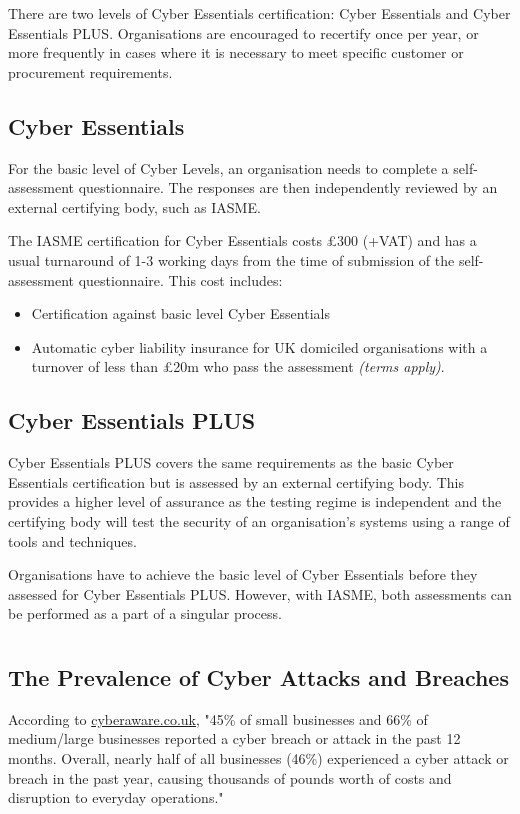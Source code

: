 \documentclass[12pt]{article}
\begin{document}
There are two levels of Cyber Essentials certification: Cyber Essentials and Cyber Essentials PLUS. Organisations are encouraged to recertify once per year, or more frequently in cases where it is necessary to meet specific customer or procurement requirements.

\subsection*{Cyber Essentials}
For the basic level of Cyber Levels, an organisation needs to complete a self-assessment questionnaire. The responses are then independently reviewed by an external certifying body, such as IASME.

The IASME certification for Cyber Essentials costs £300 (+VAT) and has a usual turnaround of 1-3 working days from the time of submission of the self-assessment questionnaire. This cost includes:
\begin{itemize}
  \item Certification against basic level Cyber Essentials
  \item Automatic cyber liability insurance for UK domiciled organisations with a\\turnover of less than £20m who pass the assessment \textit{(terms apply)}.
\end{itemize}

\subsection*{Cyber Essentials PLUS}
Cyber Essentials PLUS covers the same requirements as the basic Cyber Essentials certification but is assessed by an external certifying body. This provides a higher level of assurance as the testing regime is independent and the certifying body will test the security of an organisation's systems using a range of tools and techniques.

Organisations have to achieve the basic level of Cyber Essentials before they assessed for Cyber Essentials PLUS. However, with IASME, both assessments can be performed as a part of a singular process.


\section*{}
\subsection*{The Prevalence of Cyber Attacks and Breaches}
According to \href{https://www.cyberaware.gov.uk/cyberessentials/faq.html}{cyberaware.co.uk}, "45\% of small businesses and 66\% of medium/large businesses reported a cyber breach or attack in the past 12 months. Overall, nearly half of all businesses (46\%) experienced a cyber attack or breach in the past year, causing thousands of pounds worth of costs and disruption to everyday operations."
\end{document}
